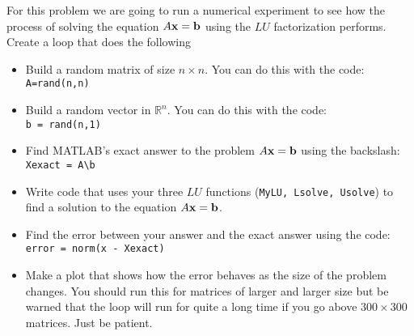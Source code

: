 \begin{problem}
    For this problem we are going to run a numerical experiment to see how the process of
    solving the equation $A {\bf x} = {\bf b}$ using the $LU$ factorization performs.\\ 
    \noindent Create a loop that does the following
    \begin{itemize}
        \item Build a random matrix of size $n \times n$. You can do this with the code:
            \\
            \verb|A=rand(n,n)|
        \item Build a random vector in $\mathbb{R}^{n}$. You can do this with the code: \\
            \verb|b = rand(n,1)|
        \item Find MATLAB's exact answer to the problem $A{\bf x}={\bf b}$ using the backslash: \\
            \verb|Xexact = A\b|
        \item Write code that uses your three $LU$ functions (\texttt{MyLU, Lsolve,
            Usolve}) to find a solution to the equation $A{\bf x}={\bf b}$.
        \item Find the error between your answer and the exact answer using the code: \\
            \verb|error = norm(x - Xexact)|
        \item Make a plot that shows how the error behaves as the size of the problem
            changes. You should run this for matrices of larger and larger size but be
            warned that the loop will run for quite a long time if you go above
            $300×300$ matrices. Just be patient.
    \end{itemize}
\end{problem}

